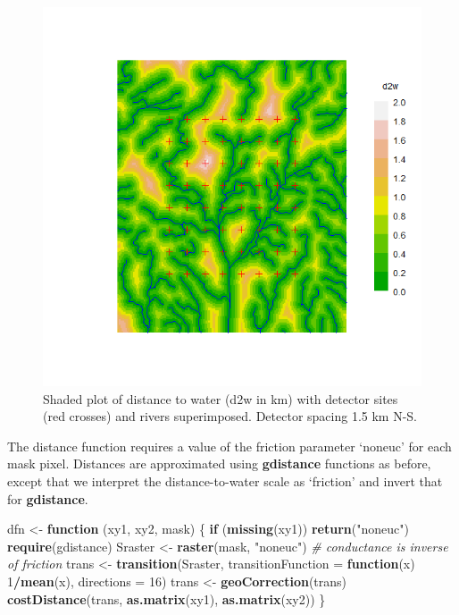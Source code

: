 \documentclass[
]{book}
\newenvironment{Shaded}{\begin{snugshade}}{\end{snugshade}}
\newcommand{\AttributeTok}[1]{\textcolor[rgb]{0.13,0.29,0.53}{#1}}
\newcommand{\CommentTok}[1]{\textcolor[rgb]{0.56,0.35,0.01}{\textit{#1}}}
\newcommand{\ControlFlowTok}[1]{\textcolor[rgb]{0.13,0.29,0.53}{\textbf{#1}}}
\newcommand{\DecValTok}[1]{\textcolor[rgb]{0.00,0.00,0.81}{#1}}
\newcommand{\FunctionTok}[1]{\textcolor[rgb]{0.13,0.29,0.53}{\textbf{#1}}}
\newcommand{\NormalTok}[1]{#1}
\newcommand{\OtherTok}[1]{\textcolor[rgb]{0.56,0.35,0.01}{#1}}
\newcommand{\SpecialCharTok}[1]{\textcolor[rgb]{0.81,0.36,0.00}{\textbf{#1}}}
\newcommand{\StringTok}[1]{\textcolor[rgb]{0.31,0.60,0.02}{#1}}
\begin{document}
\begin{figure}
\includegraphics[width=0.95\linewidth]{figures/d2w} \caption{Shaded plot of distance to water (d2w in km) with detector sites (red crosses) and rivers superimposed. Detector spacing 1.5 km N-S.}\label{fig:A1fig}
\end{figure}

The distance function requires a value of the friction parameter `noneuc' for each mask pixel. Distances are approximated using \textbf{gdistance} functions as before, except that we interpret the distance-to-water scale as `friction' and invert that for \textbf{gdistance}.

\begin{Shaded}
\begin{Highlighting}[]
\NormalTok{dfn }\OtherTok{\textless{}{-}} \ControlFlowTok{function}\NormalTok{ (xy1, xy2, mask) \{}
    \ControlFlowTok{if}\NormalTok{ (}\FunctionTok{missing}\NormalTok{(xy1)) }\FunctionTok{return}\NormalTok{(}\StringTok{"noneuc"}\NormalTok{)}
    \FunctionTok{require}\NormalTok{(gdistance)}
\NormalTok{    Sraster }\OtherTok{\textless{}{-}} \FunctionTok{raster}\NormalTok{(mask, }\StringTok{"noneuc"}\NormalTok{)}
    \CommentTok{\# conductance is inverse of friction}
\NormalTok{    trans }\OtherTok{\textless{}{-}} \FunctionTok{transition}\NormalTok{(Sraster, }\AttributeTok{transitionFunction =} 
        \ControlFlowTok{function}\NormalTok{(x) }\DecValTok{1}\SpecialCharTok{/}\FunctionTok{mean}\NormalTok{(x), }\AttributeTok{directions =} \DecValTok{16}\NormalTok{)}
\NormalTok{    trans }\OtherTok{\textless{}{-}} \FunctionTok{geoCorrection}\NormalTok{(trans)}
    \FunctionTok{costDistance}\NormalTok{(trans, }\FunctionTok{as.matrix}\NormalTok{(xy1), }\FunctionTok{as.matrix}\NormalTok{(xy2))}
\NormalTok{\}    }
\end{Highlighting}
\end{Shaded}
\end{document}
